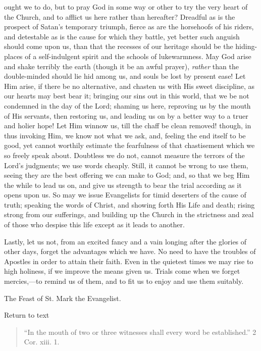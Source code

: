 ought we to do, but to pray God in some way or other to try the very
heart of the Church, and to afflict us here rather than hereafter?
Dreadful as is the prospect of Satan's temporary triumph, fierce as are
the horsehoofs of his riders, and detestable as is the cause for which
they battle, yet better such anguish should come upon us, than that the
recesses of our heritage should be the hiding-places of a self-indulgent
spirit and the schools of lukewarmness. May God arise and shake terribly
the earth (though it be an awful prayer), \emph{rather} than the
double-minded should lie hid among us, and souls be lost by present
ease! Let Him arise, if there be no alternative, and chasten us with His
sweet discipline, as our hearts may best bear it; bringing our sins out
in this world, that we be not condemned in the day of the Lord; shaming
us here, reproving us by the mouth of His servants, then restoring us,
and leading us on by a better way to a truer and holier hope! Let Him
winnow us, till the chaff be clean removed! though, in thus invoking
Him, we know not what we ask, and, feeling the end itself to be good,
yet cannot worthily estimate the fearfulness of that chastisement which
we so freely speak about. Doubtless we do not, cannot measure the
terrors of the Lord's judgments; we use words cheaply. Still, it cannot
be wrong to use them, seeing they are the best offering we can make to
God; and, so that we beg Him the while to lead us on, and give us
strength to bear the trial according as it opens upon us. So may we
issue Evangelists for timid deserters of the cause of truth; speaking
the words of Christ, and showing forth His Life and death; rising strong
from our sufferings, and building up the Church in the strictness and
zeal of those who despise this life except as it leads to another.

Lastly, let us not, from an excited fancy and a vain longing after
the glories of other days, forget the advantages which we have. No need
to have the troubles of Apostles in order to attain their faith. Even in
the quietest times we may rise to high holiness, if we improve the means
given us. Trials come when we forget mercies,—to remind us of them,
and to fit us to enjoy and use them suitably.


The Feast of St. Mark the Evangelist.

Return to text


\begin{quote}

``In the mouth of two or three witnesses shall every word be
established.'' 2 Cor. xiii. 1.

\end{quote}

